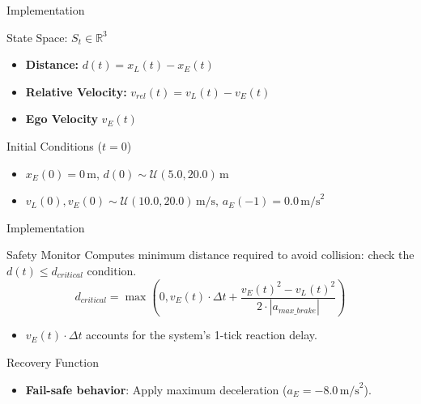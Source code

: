 \begin{frame}{Implementation}
    \begin{block}{State Space: $S_t \in \mathbb{R}^3$}
        \begin{itemize}
            \item \textbf{Distance:} $d(t) = x_L(t) - x_E(t)$
            \item \textbf{Relative Velocity:} $v_{rel}(t) = v_L(t) - v_E(t)$
            \item \textbf{Ego Velocity} $v_E(t)$
        \end{itemize}
    \end{block}
    \begin{block}{Initial Conditions ($t=0$)}
        \begin{itemize}
            \item $x_E(0) = 0\,\text{m}$, $d(0) \sim \mathcal{U}(5.0,20.0)\,\text{m}$
            \item $v_L(0), v_E(0) \sim \mathcal{U}(10.0, 20.0)\,\text{m/s}$, $a_E(-1) = 0.0\,\text{m/s}^2$
        \end{itemize}
    \end{block}
\end{frame}

\begin{frame}{Implementation}
    \begin{block}{Safety Monitor}
        Computes minimum distance required to avoid collision: check the $d(t) \le d_{critical}$ condition.
        \begin{equation*}
            d_{critical} = \max\left(0, v_E(t) \cdot \Delta t + \frac{v_E(t)^2 - v_L(t)^2}{2\cdot |a_{max\_brake}|}\right)
        \end{equation*}
        \begin{itemize}
            \item $v_E(t) \cdot \Delta t$ accounts for the system's 1-tick reaction delay.
        \end{itemize}
    \end{block}
    \begin{block}{Recovery Function}
        \begin{itemize}
            \item \textbf{Fail-safe behavior}: Apply maximum deceleration ($a_E = -8.0\,\text{m/s}^2$).
        \end{itemize}
    \end{block}
\end{frame}

